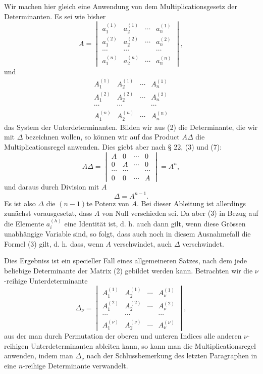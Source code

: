 \documentclass[11pt]{article}
\begin{document}
Wir machen hier gleich eine Anwendung von dem Multiplicationsgesetz der Determinanten. Es sei wie bisher
\[
A=\begin{vmatrix}
 a_1^{(1)}&a_2^{(1)}&\cdots&a_n^{(1)}\\
 a_1^{(2)}&a_2^{(2)}&\cdots&a_n^{(2)}\\
 \cdots&\cdots&&\cdots\\
 a_1^{(n)}&a_2^{(n)}&\cdots&a_n^{(n)}
\end{vmatrix},\tag{1}
\]
und
\[
\begin{matrix}
 A_1^{(1)}&A_2^{(1)}&\cdots&A_n^{(1)}\\
 A_1^{(2)}&A_2^{(2)}&\cdots&A_n^{(2)}\\
 \cdots&\cdots&&\cdots\\
 A_1^{(n)}&A_2^{(n)}&\cdots&A_n^{(n)}
\end{matrix}\tag{2}
\]
das System der Unterdeterminanten. Bilden wir aus (2) die Determinante, die wir mit $\Delta$ bezeichnen wollen, so können wir auf das Product $A\Delta$ die Multiplicationsregel anwenden. Dies giebt aber nach § 22, (3) und (7):
\[
 A\Delta=\begin{vmatrix}
 A&0&\cdots&0\\
 0&A&\cdots&0\\
 \cdots&\cdots&&\cdots\\
 0&0&\cdots&A
\end{vmatrix}=A^n,
\]
und daraus durch Division mit $A$
\begin{equation}
 \Delta=A^{n-1}.\tag{3}
\end{equation}
Es ist also $\Delta$ die $(n-1)$te Potenz von $A$. Bei dieser Ableitung ist allerdings zunächst vorausgesetzt, dass $A$ von Null verschieden sei. Da aber (3) in Bezug auf die Elemente $a_i^{(h)}$ eine Identität ist, d. h. auch dann gilt, wenn diese Grössen unabhängige Variable sind, so folgt, dass auch noch in diesem Ausnahmefall die Formel (3) gilt, d. h. dass, wenn $A$ verschwindet, auch $\Delta$ verschwindet.

Dies Ergebniss ist ein specieller Fall eines allgemeineren Satzes, nach dem jede beliebige Determinante der Matrix (2) gebildet werden kann. Betrachten wir die $\nu$-reihige Unterdeterminante
\[
\Delta_\nu=\begin{vmatrix}
 A_1^{(1)}&A_2^{(1)}&\cdots&A_\nu^{(1)}\\
 A_1^{(2)}&A_2^{(2)}&\cdots&A_\nu^{(2)}\\
 \cdots&\cdots&&\cdots\\
 A_1^{(\nu)}&A_2^{(\nu)}&\cdots&A_\nu^{(\nu)}
\end{vmatrix},\tag{4}
\]
aus der man durch Permutation der oberen und unteren Indices alle anderen $\nu$-reihigen Unterdeterminanten ableiten kann, so kann man die Multiplicationsregel anwenden, indem man $\Delta_\nu$ nach der Schlussbemerkung des letzten Paragraphen in eine $n$-reihige Determinante verwandelt.
\end{document}

